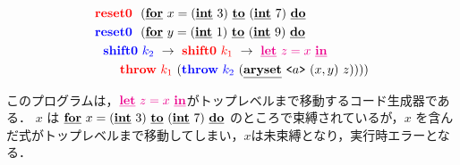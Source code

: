 \begin{align*}
  &\red{\Resetz} ~~(\cforin{x=(\cint~3)}{(\cint~7)} \\
  &\blue{\Resetz} ~~(\cforin{y=(\cint~1)}{(\cint~9)} \\
  &~~\blue{\Shiftz}~\blue{k_2}~\to~ \red{\Shiftz}~\red{k_1}~\to~ \magenta{\cLet~z=x~\cIn} \\
  &~~~~~~
    \red{\Throw}~\red{k_1}~(\blue{\Throw}~\blue{k_2}~(\caryset{\code{a}}{(x,y)}{z}))))
\end{align*}

このプログラムは，$\magenta{\cLet~z=x~\cIn}$がトップレベルまで移動するコード生成器である．
$x$ は $\cforin{x=(\cint~3)}{(\cint~7)}$ のところで束縛されているが，$x$ を含んだ式がトップレベルまで移動してしまい，$x$は未束縛となり，実行時エラーとなる．

